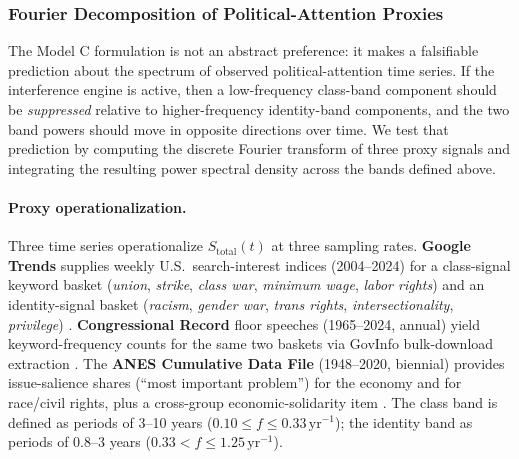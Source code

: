 \subsubsection{Fourier Decomposition of Political-Attention Proxies}
\label{sec:fourier_decomposition}

The Model C formulation is not an abstract preference: it makes a falsifiable prediction about the spectrum of observed political-attention time series. If the interference engine is active, then a low-frequency class-band component should be \emph{suppressed} relative to higher-frequency identity-band components, and the two band powers should move in opposite directions over time. We test that prediction by computing the discrete Fourier transform of three proxy signals and integrating the resulting power spectral density across the bands defined above.

\paragraph{Proxy operationalization.}
Three time series operationalize $S_{\text{total}}(t)$ at three sampling rates. \textbf{Google Trends} supplies weekly U.S.\ search-interest indices (2004--2024) for a class-signal keyword basket (\textit{union}, \textit{strike}, \textit{class war}, \textit{minimum wage}, \textit{labor rights}) and an identity-signal basket (\textit{racism}, \textit{gender war}, \textit{trans rights}, \textit{intersectionality}, \textit{privilege}) \cite{google_trends_2024}. \textbf{Congressional Record} floor speeches (1965--2024, annual) yield keyword-frequency counts for the same two baskets via GovInfo bulk-download extraction \cite{govinfo_crec_2024}. The \textbf{ANES Cumulative Data File} (1948--2020, biennial) provides issue-salience shares (``most important problem'') for the economy and for race/civil rights, plus a cross-group economic-solidarity item \cite{anes_cumulative_2022}. The class band is defined as periods of 3--10 years ($0.10 \le f \le 0.33\,\text{yr}^{-1}$); the identity band as periods of 0.8--3 years ($0.33 < f \le 1.25\,\text{yr}^{-1}$).

